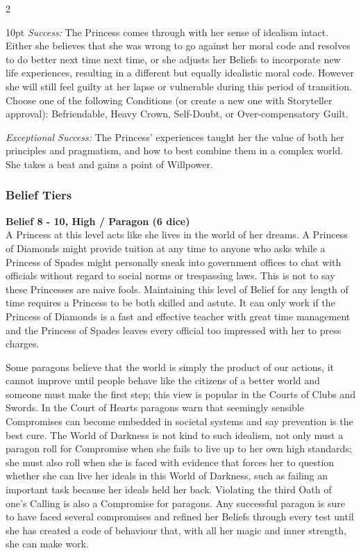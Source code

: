 \begin{multicols}{2}
\begin{myindentpar}{10pt}
\emph{Success:} The Princess comes through with her sense of idealism intact. Either she believes that she was wrong to go against her moral code and resolves to do better next time next time, or she adjusts her Beliefs to incorporate new life experiences, resulting in a different but equally idealistic moral code. However she will still feel guilty at her lapse or vulnerable during this period of transition. Choose one of the following Conditions (or create a new one with Storyteller approval): Befriendable, Heavy Crown, Self-Doubt, or Over-compensatory Guilt.

\emph{Exceptional Success:} The Princess' experiences taught her the value of both her principles and pragmatism, and how to best combine them in a complex world. She takes a beat and gains a point of Willpower. \end{myindentpar}

\subsubsection*{Belief Tiers}

\noindent\textbf{Belief 8 - 10, High / Paragon (6 dice)} \\

\noindent A Princess at this level acts like she lives in the world of her dreams. A Princess of Diamonds might provide tuition at any time to anyone who asks while a Princess of Spades might personally sneak into government offices to chat with officials without regard to social norms or trespassing laws. This is not to say these Princesses are naive fools. Maintaining this level of Belief for any length of time requires a Princess to be both skilled and astute. It can only work if the Princess of Diamonds is a fast and effective teacher with great time management and the Princess of Spades leaves every official too impressed with her to press charges. 

Some paragons believe that the world is simply the product of our actions, it cannot improve until people behave like the citizens of a better world and someone must make the first step; this view is popular in the Courts of Clubs and Swords. In the Court of Hearts paragons warn that seemingly sensible Compromises can become embedded in societal systems and say prevention is the best cure. The World of Darkness is not kind to such idealism, not only must a paragon roll for Compromise when she fails to live up to her own high standards; she must also roll when she is faced with evidence that forces her to question whether she can live her ideals in this World of Darkness, such as failing an important task because her ideals held her back. Violating the third Oath of one's Calling is also a Compromise for paragons. Any successful paragon is sure to have faced several compromises and refined her Beliefs through every test until she has created a code of behaviour that, with all her magic and inner strength, she can make work.


\end{multicols}
